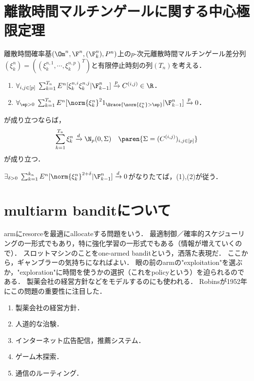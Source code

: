 \documentclass[uplatex,dvipdfmx]{jsreport}
\begin{document}
\section{離散時間マルチンゲールに関する中心極限定理}

\begin{theorem}
    離散時間確率基$(\Om^n,\F^n,(\F^n_k),P^n)$上の$p$-次元離散時間マルチンゲール差分列$(\xi^n_k)=((\xi^{n,1}_k,\cdots,\xi^{n,p}_k)^T)$と有限停止時刻の列$(T_n)$を考える．
    \begin{enumerate}
        \item $\forall_{i,j\in[p]}\;\sum^{T_n}_{k=1}E^n[\xi^{n,i}_k\xi^{n,j}_k|\F^n_{k-1}]\xrightarrow{p}C^{(i,j)}\in\R$．
        \item $\forall_{\ep>0}\;\sum^{T_n}_{k=1}E^n[\norm{\xi^n_k}^21_{\Brace{\norm{\xi^n_k}>\ep}}|\F^n_{k-1}]\xrightarrow{p}0$．
    \end{enumerate}
    が成り立つならば，
    \[\sum^{T_n}_{k=1}\xi^n_k\xrightarrow{d}\N_p(0,\Sigma)\quad\paren{\Sigma=(C^{(i,j)})_{i,j\in[p]}}\]
    が成り立つ．
\end{theorem}

\begin{lemma}
    $\exists_{\delta>0}\;\sum^{k_n}_{k=1}E^n[\norm{\xi^n_k}^{2+\delta}|\F^n_{k-1}]\xrightarrow{d}0$がなりたてば，(1),(2)が従う．
\end{lemma}

\section{multiarm banditについて}

armにresorceを最適にallocateする問題をいう．
最適制御／確率的スケジューリングの一形式でもあり，特に強化学習の一形式でもある（情報が増えていくので）．
スロットマシンのことをone-armed banditという，洒落た表現だ．
ここから，ギャンブラーの気持ちになればよい．
眼の前のarmの"exploitation"を選ぶか，"exploration"に時間を使うかの選択（これをpolicyという）を迫られるのである．
製薬会社の経営方針などをモデルするのにも使われる．
Robinsが1952年にこの問題の重要性に注目した．
\begin{enumerate}
    \item 製薬会社の経営方針．
    \item 人道的な治験．
    \item インターネット広告配信，推薦システム．
    \item ゲーム木探索．
    \item 通信のルーティング．
\end{enumerate}
\end{document}
